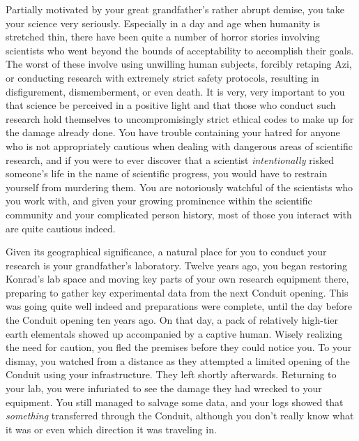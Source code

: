 \documentclass[char]{elementals}
\begin{document}
Partially motivated by your great grandfather's rather abrupt demise, you take your science very seriously. Especially in a day and age when humanity is stretched thin, there have been quite a number of horror stories involving scientists who went beyond the bounds of acceptability to accomplish their goals. The worst of these involve using unwilling human subjects, forcibly retaping Azi, or conducting research with extremely strict safety protocols, resulting in disfigurement, dismemberment, or even death. It is very, very important to you that science be perceived in a positive light and that those who conduct such research hold themselves to uncompromisingly strict ethical codes to make up for the damage already done. You have trouble containing your hatred for anyone who is not appropriately cautious when dealing with dangerous areas of scientific research, and if you were to ever discover that a scientist \emph{intentionally} risked someone's life in the name of scientific progress, you would have to restrain yourself from murdering them. You are notoriously watchful of the scientists who you work with, and given your growing prominence within the scientific community and your complicated person history, most of those you interact with are quite cautious indeed.



Given its geographical significance, a natural place for you to conduct your research is your grandfather's laboratory. Twelve years ago, you began restoring Konrad's lab space and moving key parts of your own research equipment there, preparing to gather key experimental data from the next Conduit opening. This was going quite well indeed and preparations were complete, until the day before the Conduit opening ten years ago. On that day, a pack of relatively high-tier earth elementals showed up accompanied by a captive human. Wisely realizing the need for caution, you fled the premises before they could notice you. To your dismay, you watched from a distance as they attempted a limited opening of the Conduit using your infrastructure. They left shortly afterwards. Returning to your lab, you were infuriated to see the damage they had wrecked to your equipment. You still managed to salvage some data, and your logs showed that \emph{something} transferred through the Conduit, although you don't really know what it was or even which direction it was traveling in.
\end{document}
